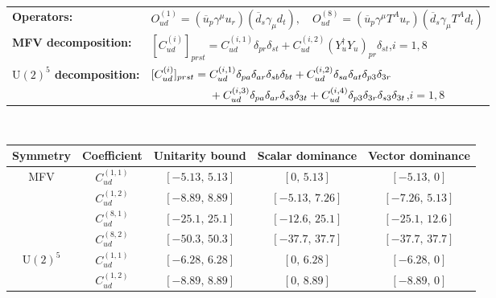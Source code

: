 \begin{table}[tbp]
\centering
{\small
\begin{tabular}{ll}
    \textbf{Operators:} &
        $\boxed{O_{ud}^{(1)} = (\overline u_p \gamma^\mu u_r)(\overline d_s \gamma_\mu d_t),\quad O_{ud}^{(8)} = (\overline u_p \gamma^\mu T^A u_r)(\overline d_s \gamma_\mu T^A d_t)}$ \\[0.2cm]
    \textbf{MFV decomposition:} &
        $[C_{ud}^{(i)}]_{prst} =
            C_{ud}^{(i,1)}\delta_{pr}\delta_{st}
            + C_{ud}^{(i,2)}(Y_u^\dagger Y_u)_{pr}\delta_{st}$,\quad $i=1,8$ \\[0.15cm]
    \textbf{$\mathrm{U}(2)^5$ decomposition:} &
        $[C_{ud}^{(i)}]_{prst} =
            C_{ud}^{(i,1)}\Pij{p}{r}{a}\Pij{s}{t}{b}
            + C_{ud}^{(i,2)}\Pij{s}{t}{a}\delta_{p3}\delta_{3r}$ \\
        & $\phantom{[C_{ud}^{(i)}]_{prst} ={}}+ C_{ud}^{(i,3)}\Pij{p}{r}{a}\delta_{s3}\delta_{3t}
            + C_{ud}^{(i,4)}\delta_{p3}\delta_{3r}\delta_{s3}\delta_{3t}$,\quad $i=1,8$ \\
\end{tabular}
\\[0.3cm]
\renewcommand{\arraystretch}{1.3}
\begin{tabular}{ccccc}
    \toprule
    \rowcolor{hdrcolor}
    \textbf{Symmetry} & \textbf{Coefficient}
        & \textbf{Unitarity bound}
        & \textbf{Scalar dominance}
        & \textbf{Vector dominance} \\
    \midrule
    \multirow{4}{*}{MFV}
        & $C_{ud}^{(1,1)}$ & $[-5.13,\, 5.13]$  & $[0,\, 5.13]$      & $[-5.13,\, 0]$    \\
        & $C_{ud}^{(1,2)}$ & $[-8.89,\, 8.89]$  & $[-5.13,\, 7.26]$  & $[-7.26,\, 5.13]$ \\
        & $C_{ud}^{(8,1)}$ & $[-25.1,\, 25.1]$  & $[-12.6,\, 25.1]$  & $[-25.1,\, 12.6]$ \\
        & $C_{ud}^{(8,2)}$ & $[-50.3,\, 50.3]$  & $[-37.7,\, 37.7]$  & $[-37.7,\, 37.7]$ \\
    \midrule
    \multirow{8}{*}{$\mathrm{U}(2)^5$}
        & $C_{ud}^{(1,1)}$ & $[-6.28,\, 6.28]$ & $[0,\, 6.28]$     & $[-6.28,\, 0]$    \\
        & $C_{ud}^{(1,2)}$ & $[-8.89,\, 8.89]$ & $[0,\, 8.89]$     & $[-8.89,\, 0]$    \\

\end{tabular}}
\end{table}
